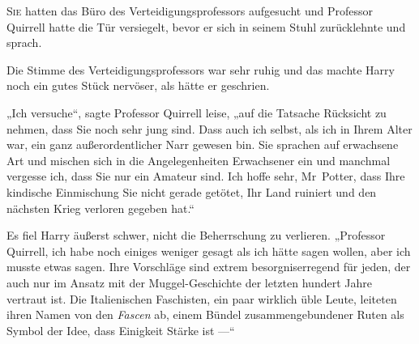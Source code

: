 
\lettrine{S}{ie} hatten das Büro des Verteidigungsprofessors aufgesucht und Professor Quirrell hatte die Tür versiegelt, bevor er sich in seinem Stuhl zurücklehnte und sprach.

Die Stimme des Verteidigungsprofessors war sehr ruhig und das machte Harry noch ein gutes Stück nervöser, als hätte er geschrien.

„Ich versuche“, sagte Professor Quirrell leise, „auf die Tatsache Rücksicht zu nehmen, dass Sie noch sehr jung sind. Dass auch ich selbst, als ich in Ihrem Alter war, ein ganz außerordentlicher Narr gewesen bin. Sie sprachen auf erwachsene Art und mischen sich in die Angelegenheiten Erwachsener ein und manchmal vergesse ich, dass Sie nur ein Amateur sind. Ich hoffe sehr, Mr~Potter, dass Ihre kindische Einmischung Sie nicht gerade getötet, Ihr Land ruiniert und den nächsten Krieg verloren gegeben hat.“

Es fiel Harry äußerst schwer, nicht die Beherrschung zu verlieren.
„Professor Quirrell, ich habe noch einiges weniger gesagt als ich hätte sagen wollen, aber ich musste etwas sagen. Ihre Vorschläge sind extrem besorgniserregend für jeden, der auch nur im Ansatz mit der Muggel-Geschichte der letzten hundert Jahre vertraut ist. Die Italienischen Faschisten, ein paar wirklich üble Leute, leiteten ihren Namen von den \emph{Fascen} ab, einem Bündel zusammengebundener Ruten als Symbol der Idee, dass Einigkeit Stärke ist —“

